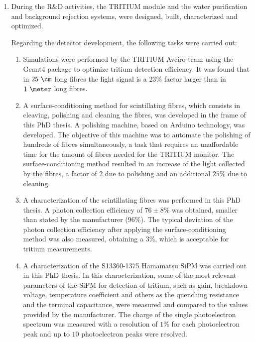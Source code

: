 \begin{enumerate}
\item{} During the R\&D activities, the TRITIUM module and the water purification and background rejection systems, were designed, built, characterized and optimized. 

Regarding the detector development, the following tasks were carried out:

\begin{enumerate}
\item{} Simulations were performed by the TRITIUM Aveiro team using the Geant4 package to optimize tritium detection efficiency. It was found that in $25~\cm$ long fibres the light signal is a $23\%$ factor larger than in $1~\meter$ long fibres. %

\item{} A surface-conditioning method for scintillating fibres, which consists in cleaving, polishing and cleaning the fibres, was developed in the frame of this PhD thesis. A polishing machine, based on Arduino technology, was developed. The objective of this machine was to automate the polishing of hundreds of fibres simultaneously, a task that requires an unaffordable time for the amount of fibres needed for the TRITIUM monitor. The surface-conditioning method resulted in an increase of the light collected by the fibres, a factor of 2 due to polishing and an additional $25\%$ due to cleaning. 

\item{} A characterization of the scintillating fibres was performed in this PhD thesis. A photon collection efficiency of $76\pm 8\%$ was obtained, smaller than stated by the manufacturer ($96\%$). The typical deviation of the photon collection efficiency after applying the surface-conditioning method was also measured, obtaining a $3\%$, which is acceptable for tritium measurements.

\item{} A characterization of the S13360-1375 Hamamatsu SiPM was carried out in this PhD thesis. In this characterization, some of the most relevant parameters of the SiPM for detection of tritium, such as gain, breakdown voltage, temperature coefficient and others as the quenching resistance and the terminal capacitance, were measured and compared to the values provided by the manufacturer. The charge of the single photoelectron spectrum was measured with a resolution of $1\%$ for each photoelectron peak and up to $10$ photoelectron peaks were resolved. %


\end{enumerate}
\end{enumerate}
